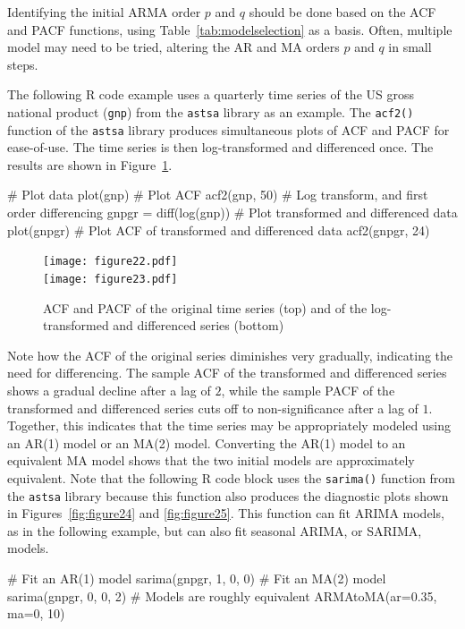 Identifying the initial ARMA order $p$ and $q$ should be done based on the ACF and PACF functions, using Table~\ref{tab:modelselection} as a basis. Often, multiple model may need to be tried, altering the AR and MA orders $p$ and $q$ in small steps. 

The following R code example uses a quarterly time series of the US gross national product (\texttt{gnp}) from the \texttt{astsa} library as an example. The \texttt{acf2()} function of the \texttt{astsa} library produces simultaneous plots of ACF and PACF for ease-of-use. The time series is then log-transformed and differenced once. The results are shown in Figure~\ref{fig:figure22}.

\begin{Rcode}
# Plot data
plot(gnp)
# Plot ACF
acf2(gnp, 50)
# Log transform, and first order differencing
gnpgr = diff(log(gnp))
# Plot transformed and differenced data
plot(gnpgr)
# Plot ACF of transformed and differenced data
acf2(gnpgr, 24)
\end{Rcode}

\begin{figure}
\centering
\texttt{[image: figure22.pdf]} \\
\texttt{[image: figure23.pdf]}
\caption[ACF and PACF after transformations]{ACF and PACF of the original time series (top) and of the log-transformed and differenced series (bottom)}
\label{fig:figure22}
\end{figure}

Note how the ACF of the original series diminishes very gradually, indicating the need for differencing. The sample ACF of the transformed and differenced series shows a gradual decline after a lag of $2$, while the sample PACF of the transformed and differenced series cuts off to non-significance after a lag of $1$. Together, this indicates that the time series may be appropriately modeled using an AR(1) model or an MA(2) model. Converting the AR(1) model to an equivalent MA model shows that the two initial models are approximately equivalent. Note that the following R code block uses the \texttt{sarima()} function from the \texttt{astsa} library because this function also produces the diagnostic plots shown in Figures~\ref{fig:figure24} and \ref{fig:figure25}. This function can fit ARIMA models, as in the following example, but can also fit seasonal ARIMA, or SARIMA, models.

\begin{Rcode}
# Fit an AR(1) model
sarima(gnpgr, 1, 0, 0)
# Fit an MA(2) model
sarima(gnpgr, 0, 0, 2)
# Models are roughly equivalent
ARMAtoMA(ar=0.35, ma=0, 10)
\end{Rcode}

